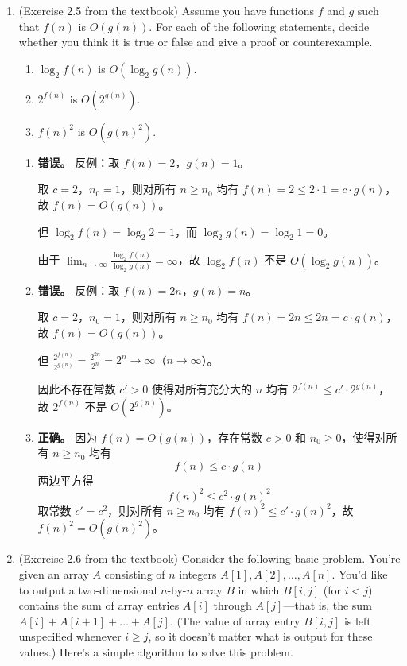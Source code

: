 \documentclass[12pt]{article}
\begin{document}
\begin{enumerate}
    \item (Exercise 2.5 from the textbook) Assume you have functions $f$ and $g$ such that $f(n)$ is $O(g(n))$. For each of the following statements, decide whether you think it is true or false and give a proof or counterexample.
    \begin{enumerate}
        \item $\log_2 f(n)$ is $O(\log_2 g(n))$.
        \item $2^{f(n)}$ is $O(2^{g(n)})$.
        \item $f(n)^2$ is $O(g(n)^2)$.
    \end{enumerate}

    \begin{enumerate}
        \item \textbf{错误。} 反例：取 $f(n) = 2$，$g(n) = 1$。

        取 $c = 2$，$n_0 = 1$，则对所有 $n \geq n_0$ 均有 $f(n) = 2 \leq 2 \cdot 1 = c \cdot g(n)$，故 $f(n) = O(g(n))$。

        但 $\log_2 f(n) = \log_2 2 = 1$，而 $\log_2 g(n) = \log_2 1 = 0$。

        由于 $\lim_{n \to \infty} \frac{\log_2 f(n)}{\log_2 g(n)} = \infty$，故 $\log_2 f(n)$ 不是 $O(\log_2 g(n))$。
  
        \item \textbf{错误。} 反例：取 $f(n) = 2n$，$g(n) = n$。

        取 $c = 2$，$n_0 = 1$，则对所有 $n \geq n_0$ 均有 $f(n) = 2n \leq 2n = c \cdot g(n)$，故 $f(n) = O(g(n))$。

        但 $\frac{2^{f(n)}}{2^{g(n)}} = \frac{2^{2n}}{2^n} = 2^n \to \infty$（$n \to \infty$）。

        因此不存在常数 $c' > 0$ 使得对所有充分大的 $n$ 均有 $2^{f(n)} \leq c' \cdot 2^{g(n)}$，故 $2^{f(n)}$ 不是 $O(2^{g(n)})$。

        \item \textbf{正确。} 因为 $f(n) = O(g(n))$，存在常数 $c > 0$ 和 $n_0 \geq 0$，使得对所有 $n \geq n_0$ 均有
        $$f(n) \leq c \cdot g(n)$$
        两边平方得
        $$f(n)^2 \leq c^2 \cdot g(n)^2$$
        取常数 $c' = c^2$，则对所有 $n \geq n_0$ 均有 $f(n)^2 \leq c' \cdot g(n)^2$，故 $f(n)^2 = O(g(n)^2)$。
    \end{enumerate}

    \bigskip

    \item (Exercise 2.6 from the textbook) Consider the following basic problem. You're given an array $A$ consisting of $n$ integers $A[1], A[2], \ldots, A[n]$. You'd like to output a two-dimensional $n$-by-$n$ array $B$ in which $B[i, j]$ (for $i < j$) contains the sum of array entries $A[i]$ through $A[j]$---that is, the sum $A[i] + A[i + 1] + \ldots + A[j]$. (The value of array entry $B[i, j]$ is left unspecified whenever $i \geq j$, so it doesn't matter what is output for these values.) Here's a simple algorithm to solve this problem.


\end{enumerate}
\end{document}
